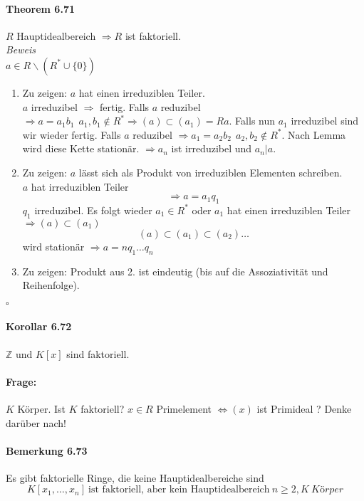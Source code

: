 \documentclass{scrartcl}
\begin{document}
\paragraph{Theorem 6.71}
$R$ Hauptidealbereich $\Rightarrow R$ ist faktoriell. \\
\textit{Beweis} \\
$a \in R\backslash (R^*\cup \{0\})$
\begin{enumerate}
\item Zu zeigen: $a$ hat einen irreduziblen Teiler. \\
  $a$ irreduzibel $\Rightarrow$ fertig. Falls $a$ reduzibel $\Rightarrow a =
  a_1b_1 ~~ a_1,b_1 \notin R^* \Rightarrow (a) \subset (a_1) = Ra$. Falls nun
  $a_1$ irreduzibel sind wir wieder fertig. Falls $a$ reduzibel $\Rightarrow
  a_1 = a_2b_2 ~~ a_2,b_2 \notin R^*$. Nach Lemma wird diese Kette stationär.
  $\Rightarrow a_n$ ist irreduzibel und $a_n|a$.
\item Zu zeigen: $a$ lässt sich als Produkt von irreduziblen Elementen
  schreiben. \\
  $a$ hat irreduziblen Teiler
  \[
    \Rightarrow a = a_1q_1
  \]
  $q_1$ irreduzibel. Es folgt wieder $a_1 \in R^*$ oder $a_1$ hat einen
  irreduziblen Teiler $\Rightarrow (a) \subset (a_1)$
  \[
    (a) \subset (a_1) \subset (a_2) \dots
  \]
  wird stationär $\Rightarrow a = n q_1 \dots q_n$
  
\item Zu zeigen: Produkt aus 2. ist eindeutig (bis auf die Assoziativität und
  Reihenfolge).
\end{enumerate}
\hfill $\square$

\paragraph{Korollar 6.72}
$\mathbb{Z}$ und $K[x]$ sind faktoriell.

\paragraph{Frage:} $K$ Körper. Ist $K$ faktoriell?
$x \in R$ Primelement $\Leftrightarrow (x)$ ist Primideal ?
Denke darüber nach!

\paragraph{Bemerkung 6.73}
Es gibt faktorielle Ringe, die keine Hauptidealbereiche sind
\[
  K[x_1, \dots, x_n] ~\text{ist faktoriell, aber kein Hauptidealbereich}~
  n \geq 2, K ~ Körper
\]
\end{document}
